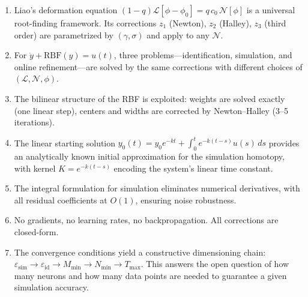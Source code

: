 \documentclass[11pt,a4paper]{article}
\begin{document}
\begin{enumerate}[nosep]
\item Liao's deformation equation $(1-q)\mathcal{L}[\phi - \phi_0] = q\,c_0\,\mathcal{N}[\phi]$ is a universal root-finding framework. Its corrections $z_1$ (Newton), $z_2$ (Halley), $z_3$ (third order) are parametrized by $(\gamma, \sigma)$ and apply to any $\mathcal{N}$.

\item For $\dot{y} + \text{RBF}(y) = u(t)$, three problems---identification, simulation, and online refinement---are solved by the same corrections with different choices of $(\mathcal{L}, \mathcal{N}, \phi)$.

\item The bilinear structure of the RBF is exploited: weights are solved exactly (one linear step), centers and widths are corrected by Newton--Halley (3--5 iterations).

\item The linear starting solution $y_0(t) = y_0 e^{-kt} + \int_0^t e^{-k(t-s)}u(s)\,ds$ provides an analytically known initial approximation for the simulation homotopy, with kernel $K = e^{-k(t-s)}$ encoding the system's linear time constant.

\item The integral formulation for simulation eliminates numerical derivatives, with all residual coefficients at $O(1)$, ensuring noise robustness.

\item No gradients, no learning rates, no backpropagation. All corrections are closed-form.

\item The convergence conditions yield a constructive dimensioning chain: $\varepsilon_{\mathrm{sim}} \to \varepsilon_{\mathrm{id}} \to M_{\min} \to N_{\min} \to T_{\max}$. This answers the open question of how many neurons and how many data points are needed to guarantee a given simulation accuracy.

\end{enumerate}
\end{document}
